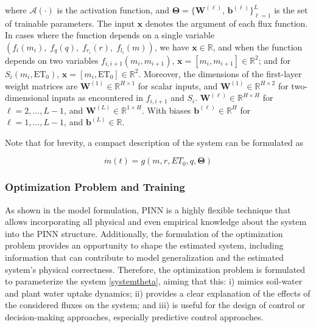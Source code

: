 \documentclass[pdflatex,sn-nature]{sn-jnl}%
\theoremstyle{thmstyleone}%
\theoremstyle{thmstyletwo}%
\theoremstyle{thmstylethree}%
\begin{document}
where \(\mathcal{A}(\cdot)\) is the activation function, and  
\(\displaystyle \boldsymbol{\Theta} = \{\mathbf{W}^{(\ell)},\,\mathbf{b}^{(\ell)}\}_{\ell=1}^L\) is the set of trainable parameters. The input \(\mathbf{x}\) denotes the argument of each flux function.  
In cases where the function depends on a single variable $\left(f_i(m_i),\;f_q(q),\;f_{r_i}(r),\;f_{l_i}(m)\right)$, we have \(\mathbf{x}\in\mathbb{R}\), and when the function depends on two variables \(f_{i,i+1}(m_i,m_{i+1})\),  
\(\displaystyle \mathbf{x}=[m_i,m_{i+1}]\in\mathbb{R}^2\); and for \(S_i(m_i,\mathrm{ET_0})\),  
\(\displaystyle \mathbf{x}=[m_i,\mathrm{ET_0}]\in\mathbb{R}^2\).  Moreover, the dimensions of the first-layer weight matrices are  
\(\mathbf{W}^{(1)}\in\mathbb{R}^{H\times1}\) for scalar inputs, and  
\(\mathbf{W}^{(1)}\in\mathbb{R}^{H\times2}\) for two-dimensional inputs as encountered in \(f_{i,i+1}\) and \(S_i\).
\( \mathbf{W}^{(\ell)} \in \mathbb{R}^{H \times H} \) for \( \ell = 2, \dots, L-1 \), and \( \mathbf{W}^{(L)} \in \mathbb{R}^{1 \times H} \). With biases \( \mathbf{b}^{(\ell)} \in \mathbb{R}^{H} \) for \( \ell = 1, \dots, L-1 \), and \( \mathbf{b}^{(L)} \in \mathbb{R} \).

Note that for brevity, a compact description of the system can be formulated as 

\begin{equation}
    \label{systemtheta}
    \dot{m}(t) = g(m,r,ET_0,q,\boldsymbol{\Theta})
\end{equation}


\subsubsection{Optimization Problem and Training}\label{subsec2}

As shown in the model formulation, PINN is a highly flexible technique that allows incorporating all physical and even empirical knowledge about the system into the PINN structure. Additionally, the formulation of the optimization problem provides an opportunity to shape the estimated system, including information that can contribute to model generalization and the estimated system's physical correctness. Therefore, the optimization problem is formulated to parameterize the system \ref{systemtheta}, aiming that this: i) mimics soil-water and plant water uptake dynamics; ii) provides a clear explanation of the effects of the considered fluxes on the system; and iii) is useful for the design of control or decision-making approaches, especially predictive control approaches.
\end{document}
